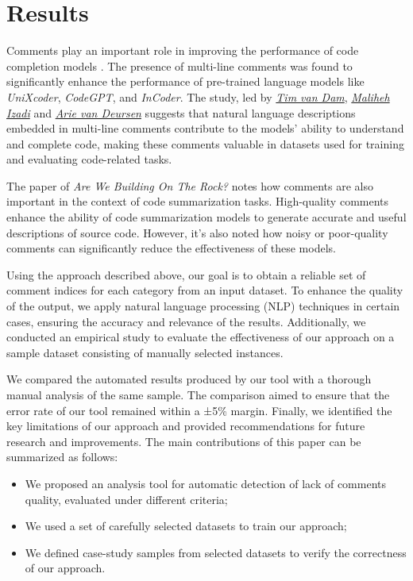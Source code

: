 \section{Results}
Comments play an important role in improving the performance of code completion models \cite{vandam2023}.
The presence of multi-line comments was found to significantly enhance the performance of pre-trained language models like \textit{UniXcoder}, \textit{CodeGPT}, and \textit{InCoder}. The study, led by \href{https://arxiv.org/search/cs?searchtype=author&query=van+Dam,+T}{\textit{Tim van Dam}}, \href{https://arxiv.org/search/cs?searchtype=author&query=Izadi,+M}{\textit{Maliheh Izadi}} and \href{https://arxiv.org/search/cs?searchtype=author&query=van+Deursen,+A}{\textit{Arie van Deursen}} suggests that natural language descriptions embedded in multi-line comments contribute to the models' ability to understand and complete code, making these comments valuable in datasets used for training and evaluating code-related tasks.

\noindent The paper of \textit{Are We Building On The Rock?} \cite{buildingRock} notes how comments are also important in the context of code summarization tasks.
High-quality comments enhance the ability of code summarization models to generate accurate and useful descriptions of source code. However, it's also noted how noisy or poor-quality comments can significantly reduce the effectiveness of these models.

\noindent Using the approach described above, our goal is to obtain a reliable set of comment indices for each category from an input dataset. To enhance the quality of the output, we apply natural language processing (NLP) techniques in certain cases, ensuring the accuracy and relevance of the results. Additionally, we conducted an empirical study to evaluate the effectiveness of our approach on a sample dataset consisting of manually selected instances.

\noindent We compared the automated results produced by our tool with a thorough manual analysis of the same sample. The comparison aimed to ensure that the error rate of our tool remained within a ±5\% margin. Finally, we identified the key limitations of our approach and provided recommendations for future research and improvements. The main contributions of this paper can be summarized as follows:
\begin{itemize}
    \item We proposed an analysis tool for automatic detection of lack of comments quality, evaluated under different criteria;
    \item We used a set of carefully selected datasets to train our approach;
    \item We defined case-study samples from selected datasets to verify the correctness of our approach.
\end{itemize}

